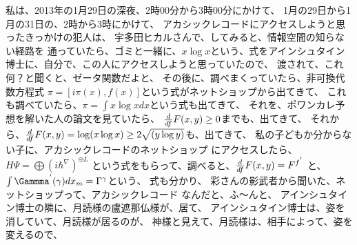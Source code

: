 \documentclass{jsarticle}
\begin{document}
  私は、2013年の1月29日の深夜、2時00分から3時00分にかけて、
  1月の29日から1月の31日の、2時から3時にかけて、
  アカシックレコードにアクセスしようと思ったきっかけの犯人は、
  宇多田ヒカルさんで、してみると、情報空間の知らない経路を
  通っていたら、ゴミと一緒に、$x\log x$という、式をアインシュタイン
  博士に、自分で、この人にアクセスしようと思っていたので、
  渡されて、これ何？と聞くと、ゼータ関数だよと、
  その後に、調べまくっていたら、非可換代数方程式
  $\pi = [i\pi(x),f(x)]$という式がネットショップから出てきて、
  これも調べていたら、$\pi = \int x\log xdx$という式も出てきて、
  それを、ポワンカレ予想を解いた人の論文を見ていたら、
  ${d \over {d f}}F(x,y) \ge 0$までも、出てきて、
  それから、${d \over {d f}}F(x,y) = \log (x \log x) \ge {2\sqrt{(y \log
  y)}}$も、出てきて、
  私の子どもか分からない子に、アカシックレコードのネットショップ
  にアクセスしたら、$H\Psi = \bigoplus{({i\hbar}^{\nabla})}^{\oplus L}$
  という式をもらって、調べると、${d \over {d f}}F(x,y) = F^{f^{'}}$
  と、$\int \Gammma^{'}(\gamma)dx_m= \Gamma^{\gamma}$という、
  式も分かり、
  彩さんの影武者から聞いた、ネットショップって、アカシックレコード
  なんだと、ふ〜んと、
  アインシュタイン博士の隣に、月読様の盧遮那仏様が、居て、
  アインシュタイン博士は、姿を消していて、月読様が居るのが、
  神様と見えて、月読様は、相手によって、姿を変えるので、


  　
\end{document}
